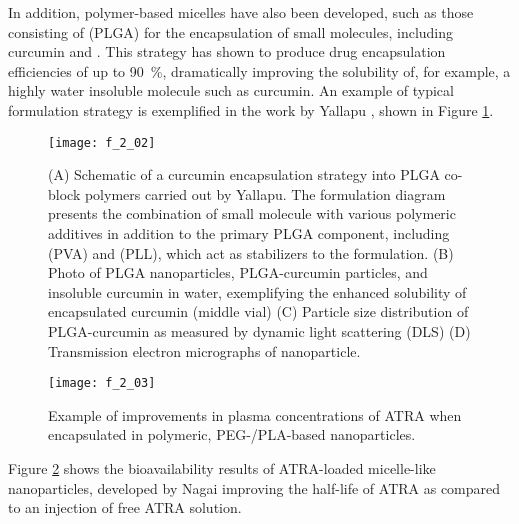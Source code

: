 \begin{refsection}
In addition, polymer-based micelles have also been developed, such as those
consisting of  (PLGA) for the
encapsulation of small molecules, including curcumin and
.\cite{Li2009,Yallapu2010b} This strategy has
shown to produce drug encapsulation efficiencies of up to \SI{90}{\percent},
dramatically improving the solubility of, for example, a highly water insoluble
molecule such as curcumin. An example of typical formulation strategy is
exemplified in the work by Yallapu , shown in Figure
\ref{fig:PLA_curcumin_example}.\cite{Yallapu2010b}
\begin{figure}[h!] \centering \texttt{[image: f\_2\_02]}
    \caption[(A) Schematic of a curcumin encapsulation strategy into PLGA co-block
    polymers carried out by Yallapu. The formulation diagram presents the
    combination of small molecule with various polymeric additives in addition
    to the primary PLGA component, including  (PVA) and
     (PLL), which act as stabilizers to the formulation.
    (B) Photo of PLGA nanoparticles, PLGA-curcumin particles, and insoluble
    curcumin in water, exemplifying the enhanced solubility of encapsulated
    curcumin (middle vial) (C) Particle size distribution of PLGA-curcumin as
    measured by dynamic light scattering (DLS) (D) Transmission electron
    micrographs of nanoparticle.
    ]{(A) Schematic of a curcumin encapsulation strategy into PLGA co-block
    polymers carried out by Yallapu. The formulation diagram presents the
    combination of small molecule with various polymeric additives in addition
    to the primary PLGA component, including  (PVA) and
     (PLL), which act as stabilizers to the formulation.
    (B) Photo of PLGA nanoparticles, PLGA-curcumin particles, and insoluble
    curcumin in water, exemplifying the enhanced solubility of encapsulated
    curcumin (middle vial) (C) Particle size distribution of PLGA-curcumin as
    measured by dynamic light scattering (DLS) (D) Transmission electron
    micrographs of nanoparticle.\cite{Yallapu2010b}}
    \label{fig:PLA_curcumin_example} \end{figure}
\begin{figure}[h!] \centering \texttt{[image: f\_2\_03]}
    \caption[Example of improvements in plasma concentrations of ATRA when
    encapsulated in polymeric, PEG-/PLA-based nanoparticles.]{Example of improvements in plasma concentrations of ATRA when
    encapsulated in polymeric, PEG-/PLA-based
    nanoparticles.\cite{Li2009}}\label{fig:PLA_ATRA_example} \end{figure}
Figure \ref{fig:PLA_ATRA_example} shows the bioavailability results of
ATRA-loaded micelle-like nanoparticles, developed by Nagai \cite{Li2009} improving the half-life of ATRA as compared to an injection of
free ATRA solution.


\end{refsection}
